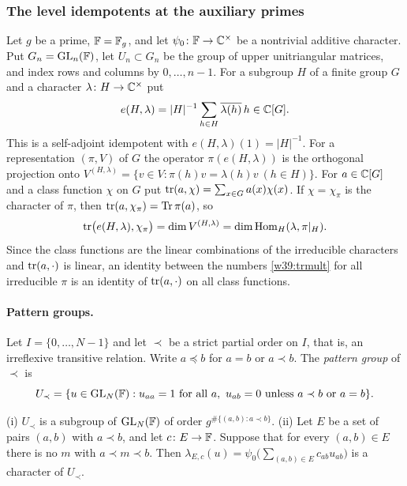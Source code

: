 \subsubsection{The level idempotents at the auxiliary primes}\label{w2x:sec:wt}
Let $g$ be a prime, $\mathbb F=\mathbb F_g$, and let $\psi_0\colon\mathbb F\to\mathbb C^\times$ be a nontrivial additive character. Put $G_n=\operatorname{GL}_n(\mathbb F)$, let $U_n\subset G_n$ be the group of upper unitriangular matrices, and index rows and columns by $0,\dots,n-1$. For a subgroup $H$ of a finite group $G$ and a character $\lambda\colon H\to\mathbb C^\times$ put
\[
e(H,\lambda)=\lvert H\rvert^{-1}\sum_{h\in H}\overline{\lambda(h)}\,h\in\mathbb C[G].
\]
This is a self-adjoint idempotent with $e(H,\lambda)(1)=\lvert H\rvert^{-1}$. For a representation $(\pi,V)$ of $G$ the operator $\pi(e(H,\lambda))$ is the orthogonal projection onto $V^{(H,\lambda)}=\{v\in V:\pi(h)v=\lambda(h)v\ (h\in H)\}$. For $a\in\mathbb C[G]$ and a class function $\chi$ on $G$ put $\operatorname{tr}(a,\chi)=\sum_{x\in G}a(x)\chi(x)$. If $\chi=\chi_\pi$ is the character of $\pi$, then $\operatorname{tr}(a,\chi_\pi)=\operatorname{Tr}\pi(a)$, so
\begin{equation}\label{w39:trmult}
\operatorname{tr}\bigl(e(H,\lambda),\chi_\pi\bigr)=\dim V^{(H,\lambda)}=\dim\operatorname{Hom}_H(\lambda,\pi|_H).
\end{equation}
Since the class functions are the linear combinations of the irreducible characters and $\operatorname{tr}(a,\cdot)$ is linear, an identity between the numbers \eqref{w39:trmult} for all irreducible $\pi$ is an identity of $\operatorname{tr}(a,\cdot)$ on all class functions.

\paragraph{Pattern groups.}

Let $I=\{0,\dots,N-1\}$ and let $\prec$ be a strict partial order on $I$, that is, an irreflexive transitive relation. Write $a\preceq b$ for $a=b$ or $a\prec b$. The \emph{pattern group} of $\prec$ is
\[
U_\prec=\{u\in\operatorname{GL}_N(\mathbb F):u_{aa}=1\text{ for all }a,\ u_{ab}=0\text{ unless }a\prec b\text{ or }a=b\}.
\]

\begin{lemma}\label{w39:pattern}
(i) $U_\prec$ is a subgroup of $\operatorname{GL}_N(\mathbb F)$ of order $g^{\#\{(a,b):a\prec b\}}$.
(ii) Let $E$ be a set of pairs $(a,b)$ with $a\prec b$, and let $c\colon E\to\mathbb F$. Suppose that for every $(a,b)\in E$ there is no $m$ with $a\prec m\prec b$. Then $\lambda_{E,c}(u)=\psi_0\bigl(\sum_{(a,b)\in E}c_{ab}u_{ab}\bigr)$ is a character of $U_\prec$.
\end{lemma}

